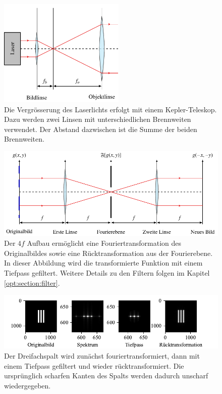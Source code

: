 \begin{figure}
    \centering
    \includegraphics[width=60mm]{papers/opt/images/laserAufweiten.pdf}
    \caption{Die Vergrösserung des Laserlichts erfolgt mit einem Kepler-Teleskop.
        Dazu werden zwei Linsen mit unterschiedlichen Brennweiten verwendet.
        Der Abstand dazwischen ist die Summe der beiden Brennweiten.}
    \label{opt:fig:laserAufweiten}
\end{figure}

\begin{figure}
    \centering
    \includegraphics[width=\textwidth]{papers/opt/images/4fAufbau.pdf}
    \caption{Der $4f$ Aufbau ermöglicht eine Fouriertransformation des Originalbildes sowie eine Rücktransformation aus der Fourierebene.
    In dieser Abbildung wird die transformierte Funktion mit einem Tiefpass gefiltert.
    Weitere Details zu den Filtern folgen im Kapitel \ref{opt:section:filter}.}
    \label{opt:fig:4fAufbau}
\end{figure}

\begin{figure}
    \centering
    \includegraphics[width=\textwidth]{papers/opt/images/dreifachspalt_tiefpass.pdf}
    \caption{Der Dreifachspalt wird zunächst fouriertransformiert, dann mit einem Tiefpass gefiltert und wieder rücktransformiert.
    Die ursprünglich scharfen Kanten des Spalts werden dadurch unscharf wiedergegeben.}
    \label{opt:fig:three_slit_simulation}
\end{figure}


